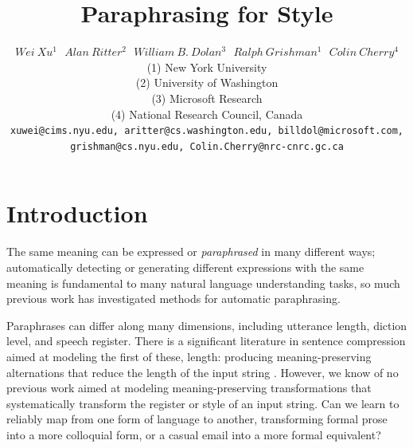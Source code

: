 \documentclass[10pt,a5paper,twoside]{article}
\title{Paraphrasing for Style}
\author{$Wei~Xu^{1}~~~Alan~Ritter^{2}~~~William~B.~Dolan^{3}~~~Ralph~Grishman^{1}~~~Colin~Cherry^{4}$\\
{\small  	(1) New York University\\ 
 		(2) University of Washington\\
		(3) Microsoft Research\\
		(4) National Research Council, Canada\\
  \texttt{xuwei@cims.nyu.edu, aritter@cs.washington.edu, billdol@microsoft.com, grishman@cs.nyu.edu, Colin.Cherry@nrc-cnrc.gc.ca} \\ 
}}
\begin{document}
\maketitle


\newpage
\section{Introduction}

The same meaning can be expressed or \emph{paraphrased} in many different ways; automatically detecting or generating different expressions with the same meaning is fundamental to many natural language understanding tasks\cite{Giampiccolo07}, so much previous work has investigated methods for automatic paraphrasing\cite{madnani2010generating}.

Paraphrases can differ along many dimensions, including utterance length, diction level, and speech register. 
There is a significant literature in sentence compression aimed at modeling the first of these, length: 
producing meaning-preserving alternations that reduce the length of the input string \cite{Chandrasekar96,Vanderwende07,clarke2008global,cohn2009sentence,Yatskar10}.
However, we know of no previous work aimed at modeling meaning-preserving transformations that systematically transform the register or style of an input string. 
Can we learn to reliably map from one form of language to another, transforming formal prose into a more colloquial form, or a casual email into a more formal equivalent?
\end{document}
